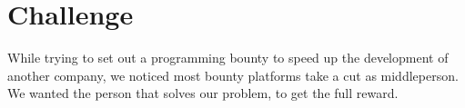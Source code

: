 \vspace{-0.16cm}
\section{Challenge}
\vspace{-0.15cm}
While trying to set out a programming bounty to speed up the development of another company, we noticed most bounty platforms take a cut as middleperson. We wanted the person that solves our problem, to get the full reward.
